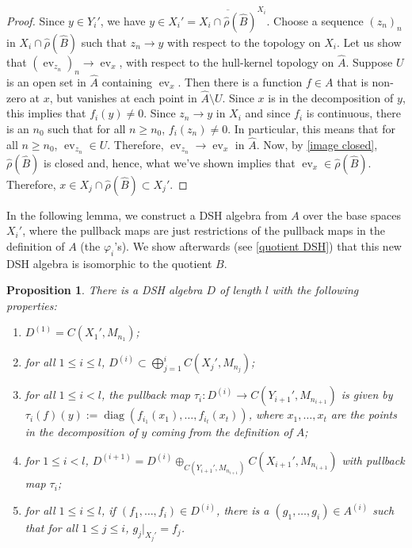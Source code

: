 \documentclass[12pt]{amsart}
\numberwithin{equation}{section}
\newtheorem{proposition}[theorem]{Proposition}
\theoremstyle{definition}
\theoremstyle{remark}
\newcommand{\diag}{\operatorname{diag}}
\newcommand{\ev}{\operatorname{ev}}
\begin{document}
\begin{proof}
	Since $y\in Y_{i}'$, we have $y\in X_{i}'=\overline{X_{i}\cap\hat{\rho}(\hat{B})}^{X_{i}}$. Choose a sequence $(z_{n})_{n}$ in $X_{i}\cap\hat{\rho}(\hat{B})$ such that $z_{n}\to y$ with respect to the topology on $X_{i}$. Let us show that $(\ev_{z_{n}})_{n}\to \ev_{x}$, with respect to the hull-kernel topology on $\hat{A}$. Suppose $U$ is an open set in $\hat{A}$ containing $\ev_{x}$. Then there is a function $f\in A$ that is non-zero at $x$, but vanishes at each point in $\hat{A}\setminus U$. Since $x$ is in the decomposition of $y$, this implies that $f_{i}(y)\not=0$. Since $z_{n}\to y$ in $X_{i}$ and since $f_{i}$ is continuous, there is an $n_{0}$ such that for all $n\geq n_{0}$, $f_{i}(z_{n})\not=0$. In particular, this means that for all $n\geq n_{0}$, $\ev_{z_{n}}\in U$. Therefore, $\ev_{z_{n}}\to \ev_{x}$ in $\hat{A}$. Now, by \autoref{image closed}, $\hat{\rho}(\hat{B})$ is closed and, hence, what we've shown implies that $\ev_{x}\in\hat{\rho}(\hat{B})$. Therefore, $x\in X_{j}\cap\hat{\rho}(\hat{B})\subset X_{j}'$. 
\end{proof}


In the following lemma, we construct a DSH algebra from $A$ over the base spaces $X_{i}'$, where the pullback maps are just restrictions of the pullback maps in the definition of $A$ (the $\varphi_{i}$'s). We show afterwards (see \autoref{quotient DSH}) that this new DSH algebra is isomorphic to the quotient $B$. 


\begin{proposition}
	\label{isomorphic quotient}
	There is a DSH algebra $D$ of length $ l$ with the following properties:
	\begin{enumerate}
		\item $D^{(1)}=C(X_{1}',M_{n_{1}})$; 
		\item for all $1\leq i\leq  l$, $D^{(i)}\subset\bigoplus_{j=1}^{i}C(X_{j}',M_{n_{j}})$;
		\item for all $1\leq i < l$, %
		the pullback map $\tau_{i}\colon D^{(i)}\to C(Y_{i+1}',M_{n_{i+1}})$ is given by $\tau_{i}(f)(y):=\diag(f_{i_{1}}(x_{1}),\ldots,f_{i_{t}}(x_{t}))$, where $x_{1},\ldots,x_{t}$ are the points in the decomposition of $y$ coming from the definition of $A$;
		\item for $1\leq i<  l$, $D^{(i+1)}=D^{(i)}\oplus_{C(Y_{i+1}',M_{n_{i+1}})}C(X_{i+1}',M_{n_{i+1}})$ with pullback map $\tau_{i}$;
		\item for all $1\leq i\leq  l$, if $(f_{1},\ldots,f_{i})\in D^{(i)}$, there is a $(g_{1},\ldots,g_{i})\in A^{(i)}$ such that for all $1\leq j\leq i$, $g_{j}|_{X_{j}'}=f_{j}$. 
	\end{enumerate}
\end{proposition}
\end{document}
